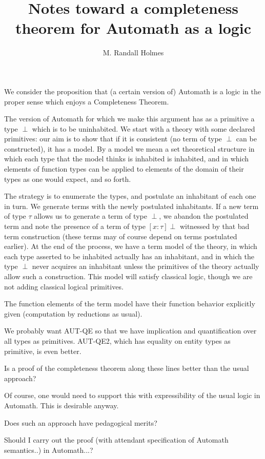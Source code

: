 \documentclass{article}
\title{Notes toward a completeness theorem for Automath as a logic}
\author{M. Randall Holmes}
\begin{document}
\maketitle

We consider the proposition that (a certain version of) Automath is a logic in the proper sense which enjoys a Completeness Theorem.

The version of Automath for which we make this argument has as a primitive a type $\perp$ which is to be uninhabited.  We start with a theory with some declared primitives:  our aim is to show that if it is consistent (no term of type $\perp$ can be constructed), it has a model.  By a model we mean a set theoretical structure in which each type that the model thinks is inhabited is inhabited, and in which elements of function types can be applied to elements of the domain of their types as one would expect, and so forth.

The strategy is to enumerate the types, and postulate an inhabitant of each one in turn.  We generate terms with the newly postulated inhabitants.  If a new term of type $\tau$ allows us to
generate a term of type $\perp$, we abandon the postulated term and note the presence of a term of type $[x:\tau]\perp$ witnessed by that bad term construction (these terms may of course depend on terms postulated earlier).  At the end of the process, we
have a term model of the theory, in which each type asserted to be inhabited actually has an inhabitant, and in which the type $\perp$ never acquires an inhabitant unless the primitives of the theory actually allow such a construction.  This model will satisfy classical logic, though we are not adding classical logical primitives.

The function elements of the term model have their function behavior explicitly given (computation by reductions as usual).

We probably want AUT-QE so that we have implication and quantification over all types as primitives.  AUT-QE2, which has equality on entity types as primitive, is even better.

Is a proof of the completeness theorem along these lines better than the usual approach?

Of course, one would need to support this with expressibility of the usual logic in Automath.  This is desirable anyway.

Does such an approach have pedagogical merits?

Should I carry out the proof (with attendant specification of Automath semantics..) in Automath...?
\end{document}
